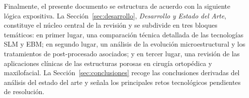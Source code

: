 Finalmente, el presente documento se estructura de acuerdo con la siguiente lógica expositiva. La Sección~\ref{sec:desarrollo}, \textit{Desarrollo y Estado del Arte}, constituye el núcleo central de la revisión y se subdivide en tres bloques temáticos: en primer lugar, una comparación técnica detallada de las tecnologías SLM y EBM; en segundo lugar, un análisis de la evolución microestructural y los tratamientos de post-procesado asociados; y en tercer lugar, una revisión de las aplicaciones clínicas de las estructuras porosas en cirugía ortopédica y maxilofacial. La Sección~\ref{sec:conclusiones} recoge las conclusiones derivadas del análisis del estado del arte y señala los principales retos tecnológicos pendientes de resolución.
